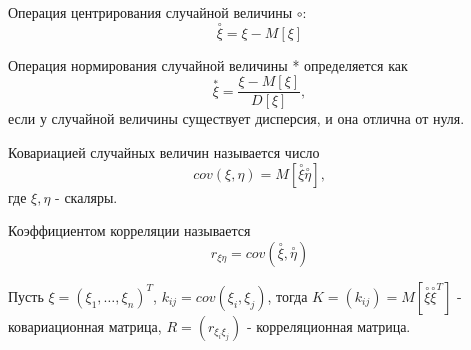 \begin{definition}
Операция центрирования случайной величины $\circ$:
$$
\overset{\circ}{\xi} = \xi - M[\xi]
$$
\end{definition}

\begin{definition}
Операция нормирования случайной величины * определяется как
$$
\overset{*}{\xi} = \frac{\xi - M[\xi]}{D[\xi]},
$$
если у случайной величины существует дисперсия, и она отлична от нуля.
\end{definition}

\begin{definition}
Ковариацией случайных величин называется число
$$
cov(\xi, \eta) = M[\overset{\circ}{\xi}\overset{\circ}{\eta}],
$$
где $\xi,\eta$ - скаляры.
\end{definition}

\begin{definition}
Коэффициентом корреляции называется
$$
r_{\xi\eta} = cov(\overset{\circ}{\xi}, \overset{\circ}{\eta})
$$
\end{definition}

\begin{definition}
    Пусть $\xi = (\xi_1, \ldots, \xi_n)^T$, $k_{ij} = cov(\xi_i, \xi_j)$, тогда
    $K = (k_{ij}) = M[\overset{\circ}{\xi}\overset{\circ}{\xi}^T]$
    - ковариационная матрица,
    $R = (r_{\xi_i\xi_j})$ - корреляционная матрица.
\end{definition}

